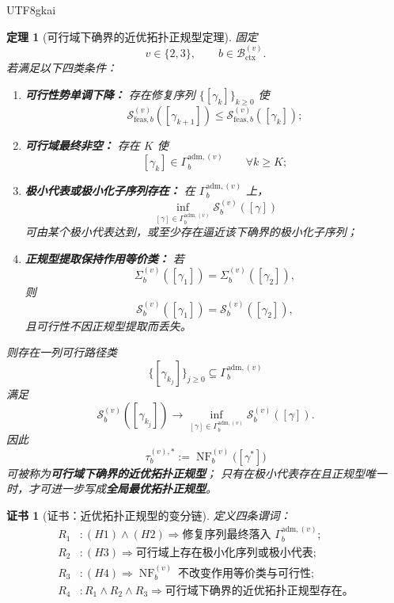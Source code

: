 \documentclass[12pt]{article}
\newtheorem{theorem}{定理}[section]
\newtheorem{Certificate}{证书}[section]
\newcommand{\NF}{\operatorname{NF}}
\begin{document}
\begin{CJK*}{UTF8}{gkai}
\begin{theorem}[可行域下确界的近优拓扑正规型定理]
\label{thm:tex39-near-opt}
固定
\[
  v\in\{2,3\},
  \qquad
  b\in\mathcal B_{\mathrm{ctx}}^{(v)}.
\]
若满足以下四类条件：
\begin{enumerate}
  \item[(H1)] \textbf{可行性势单调下降：}
  存在修复序列 $\{[\gamma_k]\}_{k\ge 0}$ 使
  \[
    \mathcal S_{\mathrm{feas},b}^{(v)}([\gamma_{k+1}])
    \le
    \mathcal S_{\mathrm{feas},b}^{(v)}([\gamma_k]);
  \]
  \item[(H2)] \textbf{可行域最终非空：}
  存在 $K$ 使
  \[
    [\gamma_k]\in\Gamma_b^{\mathrm{adm},(v)}
    \qquad
    \forall k\ge K;
  \]
  \item[(H3)] \textbf{极小代表或极小化子序列存在：}
  在 $\Gamma_b^{\mathrm{adm},(v)}$ 上，
  \[
    \inf_{[\gamma]\in\Gamma_b^{\mathrm{adm},(v)}}\mathcal S_b^{(v)}([\gamma])
  \]
  可由某个极小代表达到，或至少存在逼近该下确界的极小化子序列；
  \item[(H4)] \textbf{正规型提取保持作用等价类：}
  若
  \[
    \Sigma_b^{(v)}([\gamma_1])=\Sigma_b^{(v)}([\gamma_2]),
  \]
  则
  \[
    \mathcal S_b^{(v)}([\gamma_1])=\mathcal S_b^{(v)}([\gamma_2]),
  \]
  且可行性不因正规型提取而丢失。
\end{enumerate}
则存在一列可行路径类
\[
  \{[\gamma_{k_j}]\}_{j\ge 0}
  \subseteq
  \Gamma_b^{\mathrm{adm},(v)}
\]
满足
\[
  \mathcal S_b^{(v)}([\gamma_{k_j}])
  \longrightarrow
  \inf_{[\gamma]\in\Gamma_b^{\mathrm{adm},(v)}}
  \mathcal S_b^{(v)}([\gamma]).
\]
因此
\[
  \tau_b^{(v),\ast}
  :=
  \NF_b^{(v)}\bigl([\gamma^\ast]\bigr)
\]
可被称为\textbf{可行域下确界的近优拓扑正规型}；
只有在极小代表存在且正规型唯一时，才可进一步写成\textbf{全局最优拓扑正规型}。
\end{theorem}

\begin{Certificate}[证书：近优拓扑正规型的变分链]
\label{cert:tex39-near-opt}
定义四条谓词：
\[
\begin{aligned}
  R_1 &: (H1)\wedge(H2)
  \Rightarrow
  \text{修复序列最终落入 }\Gamma_b^{\mathrm{adm},(v)};\\
  R_2 &: (H3)
  \Rightarrow
  \text{可行域上存在极小化序列或极小代表};\\
  R_3 &: (H4)
  \Rightarrow
  \NF_b^{(v)}\ \text{不改变作用等价类与可行性};\\
  R_4 &: R_1\wedge R_2\wedge R_3
  \Rightarrow
  \text{可行域下确界的近优拓扑正规型存在。}
\end{aligned}
\]
\end{Certificate}


\end{CJK*}
\end{document}
